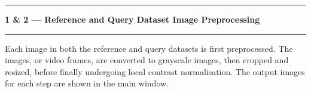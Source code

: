 \noindent\rule{\textwidth}{1pt}
\indent \textbf{1 \& 2 --- Reference and Query Dataset Image Preprocessing}
\noindent\rule{\textwidth}{1pt}
\smallskip
\parbox{\textwidth}{Each image in both the reference and query datasets is first preprocessed. The images, or video frames, are converted to grayscale images, then cropped and resized, before finally undergoing local contrast normalisation. The output images for each step are shown in the main window.}
\smallskip
